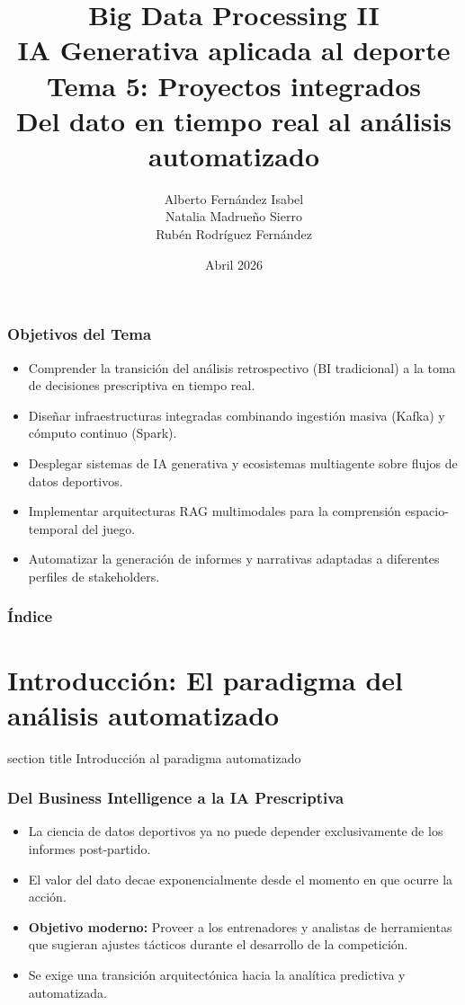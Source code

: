 \documentclass[aspectratio=169]{beamer}
\institute[URJC]{DSLAB}
\author[Big Data Processing II]{
	Alberto Fernández Isabel \\
	Natalia Madrueño Sierro \\
	Rubén Rodríguez Fernández \\
}
\title[Presentación]{
	Big Data Processing II \\ \vspace{0.2em}
	IA Generativa aplicada al deporte \\ \vspace{0.2em}
    Tema 5: Proyectos integrados \\ \vspace{0.2em}
    Del dato en tiempo real al análisis automatizado
}
\date{Abril 2026}
\newcommand{\sectionpagetitle}[1]{
\begin{frame}
	\vspace{1cm}
	\begin{beamercolorbox}[sep=8pt,center,wd=\textwidth]{section title}
		\usebeamerfont{section title}#1\par
	\end{beamercolorbox}
\end{frame}
}
\begin{document}
\begin{frame}
\titlepage
\end{frame}

\begin{frame}\frametitle{Objetivos del Tema}
\begin{itemize}
    \item Comprender la transición del análisis retrospectivo (BI tradicional) a la toma de decisiones prescriptiva en tiempo real.
    \item Diseñar infraestructuras integradas combinando ingestión masiva (Kafka) y cómputo continuo (Spark).
    \item Desplegar sistemas de IA generativa y ecosistemas multiagente sobre flujos de datos deportivos.
    \item Implementar arquitecturas RAG multimodales para la comprensión espacio-temporal del juego.
    \item Automatizar la generación de informes y narrativas adaptadas a diferentes perfiles de stakeholders.
\end{itemize}
\end{frame}

\begin{frame}\frametitle{Índice}
\tableofcontents
\end{frame}

\section{Introducción: El paradigma del análisis automatizado}
\sectionpagetitle{Introducción al paradigma automatizado}

\begin{frame}\frametitle{Del Business Intelligence a la IA Prescriptiva}
\begin{itemize}
    \item La ciencia de datos deportivos ya no puede depender exclusivamente de los informes post-partido.
    \item El valor del dato decae exponencialmente desde el momento en que ocurre la acción.
    \item \textbf{Objetivo moderno:} Proveer a los entrenadores y analistas de herramientas que sugieran ajustes tácticos durante el desarrollo de la competición.
    \item Se exige una transición arquitectónica hacia la analítica predictiva y automatizada.
\end{itemize}
\end{frame}
\end{document}
